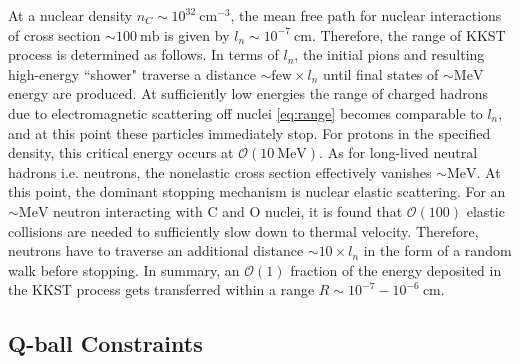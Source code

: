\documentclass[twocolumn,showpacs,preprintnumbers,amsmath,amssymb,prl]{revtex4}
\newcommand{\OO}{\mathcal{O}}
\begin{document}
At a nuclear density $n_C \sim 10^{32} ~\text{cm}^{-3}$, the mean free path for nuclear interactions of cross section $\sim 100 ~\text{mb}$ is given by $l_n \sim 10^{-7} ~\text{cm}$. Therefore, the range of KKST process is determined as follows. In terms of $l_n$, the initial pions and resulting high-energy ``shower" traverse a distance $\sim \text{few} \times l_n$ until final states of $\sim \text{MeV}$ energy are produced. At sufficiently low energies the range of charged hadrons due to electromagnetic scattering off nuclei \eqref{eq:range} becomes comparable to $l_n$, and at this point these particles immediately stop. For protons in the specified density, this critical energy occurs at $\OO(10 ~\text{MeV})$. As for long-lived neutral hadrons i.e. neutrons, the nonelastic cross section effectively vanishes $\sim \text{MeV}$. At this point, the dominant stopping mechanism is nuclear elastic scattering. For an $\sim \text{MeV}$ neutron interacting with C and O nuclei, it is found that $\OO(100)$ elastic collisions are needed to sufficiently slow down to thermal velocity. Therefore, neutrons have to traverse an additional distance $\sim 10 \times l_n$ in the form of a random walk before stopping. In summary, an $\OO(1)$ fraction of the energy deposited in the KKST process gets transferred within a range $R \sim 10^{-7} - 10^{-6} ~\text{cm}$. 

\subsection{Q-ball Constraints}
\end{document}
